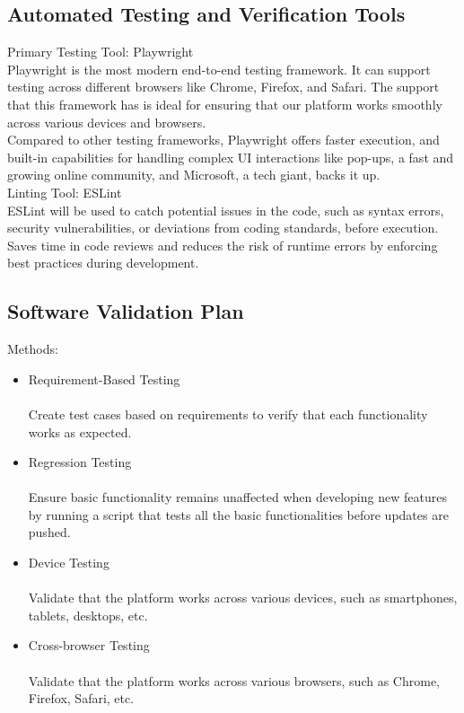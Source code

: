 \documentclass[12pt, titlepage]{article}
\begin{document}
\subsection{Automated Testing and Verification Tools}

\noindent Primary Testing Tool: Playwright\\

\noindent Playwright is the most modern end-to-end testing framework. It can support testing across different browsers like Chrome, Firefox, and Safari. The support that this framework has is ideal for ensuring that our platform works smoothly across various devices and browsers.\\

\noindent Compared to other testing frameworks, Playwright offers faster execution, and built-in capabilities for handling complex UI interactions like pop-ups, a fast and growing online community, and Microsoft, a tech giant, backs it up. \\

\noindent Linting Tool: ESLint\\

\noindent ESLint will be used to catch potential issues in the code, such as syntax errors, security vulnerabilities, or deviations from coding standards, before execution.\\

\noindent Saves time in code reviews and reduces the risk of runtime errors by enforcing best practices during development.

\subsection{Software Validation Plan}

Methods: \\

\begin{itemize}
    \item Requirement-Based Testing
    \\ \\ Create test cases based on requirements to verify that each functionality works as expected.
    
    \item Regression Testing
    \\ \\ Ensure basic functionality remains unaffected when developing new features by running a script that tests all the basic functionalities before updates are pushed.

    \item Device Testing
    \\ \\ Validate that the platform works across various devices, such as smartphones, tablets, desktops, etc.

    \item Cross-browser Testing
    \\ \\ Validate that the platform works across various browsers,
    such as Chrome, Firefox, Safari, etc.
    
\end{itemize}
\end{document}
